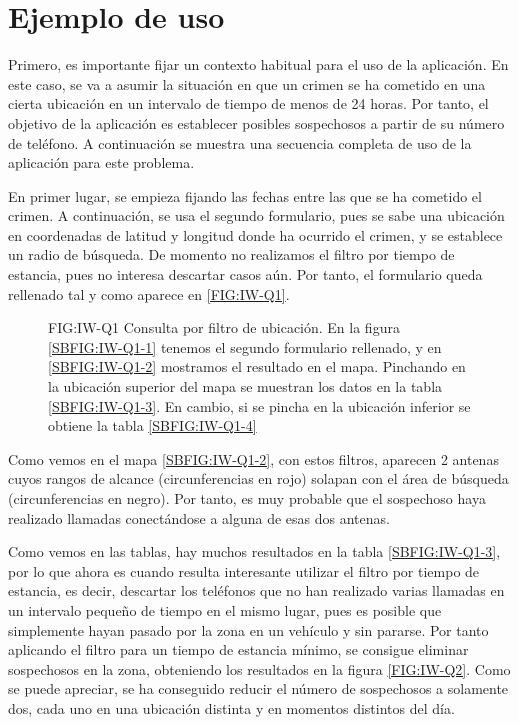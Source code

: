  \section{Ejemplo de uso}
    Primero, es importante fijar un contexto habitual para el uso de la aplicación. En este caso, se va a asumir la situación en que un crimen se ha cometido en una cierta ubicación en un intervalo de tiempo de menos de 24 horas. Por tanto, el objetivo de la aplicación es establecer posibles sospechosos a partir de su número de teléfono.
    A continuación se muestra una secuencia completa de uso de la aplicación para este problema.
    
    En primer lugar, se empieza fijando las fechas entre las que se ha cometido el crimen. A continuación, se usa el segundo formulario, pues se sabe una ubicación en coordenadas de latitud y longitud donde ha ocurrido el crimen, y se establece un radio de búsqueda. De momento no realizamos el filtro por tiempo de estancia, pues no interesa descartar casos aún. Por tanto, el formulario queda rellenado tal y como aparece en \ref{FIG:IW-Q1}.
    
    \begin{figure}[Consulta por filtro de ubicación]{FIG:IW-Q1}
      {Consulta por filtro de ubicación. En la figura \ref{SBFIG:IW-Q1-1} tenemos el segundo formulario rellenado, y en \ref{SBFIG:IW-Q1-2} mostramos el resultado en el mapa. Pinchando en la ubicación superior del mapa se muestran los datos en la tabla \ref{SBFIG:IW-Q1-3}. En cambio, si se pincha en la ubicación inferior se obtiene la tabla \ref{SBFIG:IW-Q1-4}}
      \quad
      \quad
      \quad
    \end{figure}
  
    Como vemos en el mapa \ref{SBFIG:IW-Q1-2}, con estos filtros, aparecen 2 antenas cuyos rangos de alcance (circunferencias en rojo) solapan con el área de búsqueda (circunferencias en negro). Por tanto, es muy probable que el sospechoso haya realizado llamadas conectándose a alguna de esas dos antenas.
    
    Como vemos en las tablas, hay muchos resultados en la tabla \ref{SBFIG:IW-Q1-3}, por lo que ahora es cuando resulta interesante utilizar el filtro por tiempo de estancia, es decir, descartar los teléfonos que no han realizado varias llamadas en un intervalo pequeño de tiempo en el mismo lugar, pues es posible que simplemente hayan pasado por la zona en un vehículo y sin pararse. 
    Por tanto aplicando el filtro para un tiempo de estancia mínimo, se consigue eliminar sospechosos en la zona, obteniendo los resultados en la figura \ref{FIG:IW-Q2}.    Como se puede apreciar, se ha conseguido reducir el número de sospechosos a solamente dos, cada uno en una ubicación distinta y en momentos distintos del día.
    
